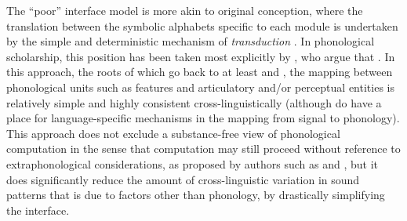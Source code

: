 The \enquote{poor} interface model is more akin to  original conception, where the translation between the symbolic alphabets specific to each module is undertaken by the simple and deterministic mechanism of \emph{transduction} \citep[\egm][]{pylyshyn84:_comput}. In phonological scholarship, this position has been taken most explicitly by \citet{hale-kissock-reiss,reiss07:_modul,hale-reiss2008}, who argue that . In this approach, the roots of which go back to at least \citet{jfh} and \citet{spe}, the mapping between phonological units such as features and articulatory and\fshyp or perceptual entities is relatively simple and highly consistent cross\hyp linguistically (although \citealt{hale-kissock-reiss} do have a place for language\hyp specific mechanisms in the mapping from signal to phonology). This approach does not exclude a substance\hyp free view of phonological computation in the sense that computation may still proceed without reference to extraphonological considerations, as proposed by authors such as \citet{hale00,hale00:_phonol,hale-reiss2008,hale-kissock-reiss,reiss03:_quant,reiss07:_modul} and \citet{samuels11:_phonol}, but it does significantly reduce the amount of cross\hyp linguistic variation in sound patterns that is due to factors other than phonology, by drastically simplifying the interface.

